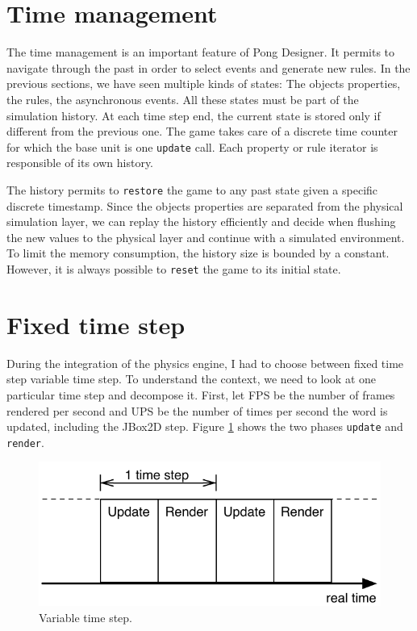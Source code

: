 \documentclass[11pt,a4paper]{article}
\begin{document}
\section{Time management}
The time management is an important feature of Pong Designer. It permits to navigate through the past in order to select events and generate new rules. In the previous sections, we have seen multiple kinds of states: The objects properties, the rules, the asynchronous events. All these states must be part of the simulation history. At each time step end, the current state is stored only if different from the previous one. The game takes care of a discrete time counter for which the base unit is one \texttt{update} call. Each property or rule iterator is responsible of its own history. 

The history permits to \texttt{restore} the game to any past state given a specific discrete timestamp. Since the objects properties are separated from the physical simulation layer, we can replay the history efficiently and decide when flushing the new values to the physical layer and continue with a simulated environment. To limit the memory consumption, the history size is bounded by a constant. However, it is always possible to  \texttt{reset} the game to its initial state.

\section{Fixed time step}
During the integration of the physics engine, I had to choose between fixed time step variable time step. To understand the context, we need to look at one particular time step and decompose it. First, let FPS be the number of frames rendered per second and UPS be the number of times per second the word is updated, including the JBox2D step. Figure \ref{fig:variableTimeStep} shows the two phases \texttt{update} and \texttt{render}. 

\begin{figure}[h]
\centering
\includegraphics[scale = 0.8]{images/variableTimeStep} 
\caption{Variable time step.}
\label{fig:variableTimeStep}
\end{figure}
\end{document}
